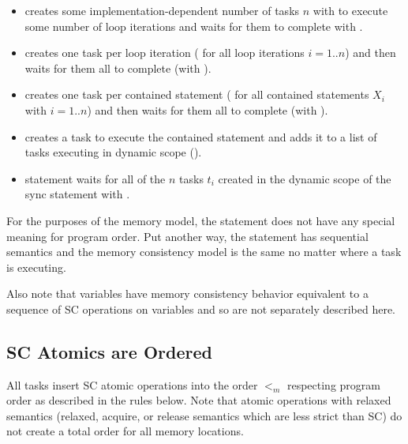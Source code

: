 \begin{itemize}

  \item {} creates some implementation-dependent number of tasks $n$
with  to execute some number of loop
iterations and waits for them to complete with .

  \item {} creates one task per loop iteration ( for all loop iterations $i=1..n$) and then waits for them
all to complete (with ).

  \item {} creates one task per contained statement ( for all contained statements $X_i$ with $i=1..n$) and then
waits for them all to complete (with ).

  \item {} creates a task to execute the contained statement and adds
it to a list of tasks executing in dynamic scope ().

  \item {} statement waits for all of the $n$ tasks $t_i$ created in
the dynamic scope of the sync statement with .

\end{itemize}

For the purposes of the memory model, the  statement does not have any
special meaning for program order. Put another way, the  statement has
sequential semantics and the memory consistency model is the same no matter
where a task is executing.

Also note that  variables have memory consistency behavior
equivalent to a sequence of SC operations on  variables and so are
not separately described here. 

\subsection{SC Atomics are Ordered}
\label{sc_atomics_ordered}

All tasks insert SC atomic operations into the order $<_m$ respecting
program order as described in the rules below. Note that atomic operations with
relaxed semantics (relaxed, acquire, or release semantics which are less strict
than SC) do not create a total order for all memory locations.

